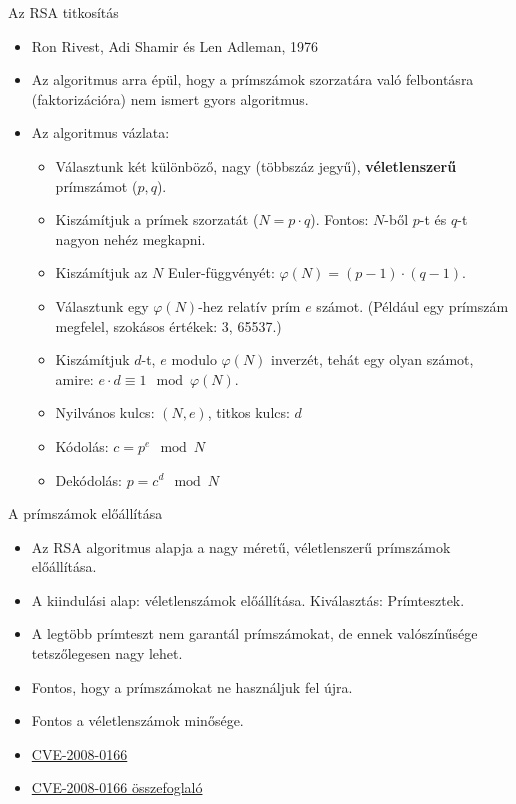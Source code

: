 \documentclass[12 pt]{beamer}
\begin{document}
\begin{frame}{Az RSA titkosítás}
  \begin{itemize}
    \item{Ron Rivest, Adi Shamir és Len Adleman, 1976}
    \item{Az algoritmus arra épül, hogy a prímszámok szorzatára való felbontásra (faktorizációra) nem ismert gyors algoritmus.}
    \item{Az algoritmus vázlata:}
      \begin{itemize}
        \item{Választunk két különböző, nagy (többszáz jegyű), \textbf{véletlenszerű} prímszámot ($p, q$).}
        \item{Kiszámítjuk a prímek szorzatát ($N = p \cdot q$). Fontos: $N$-ből $p$-t és $q$-t nagyon nehéz megkapni.}
        \item{Kiszámítjuk az $N$ Euler-függvényét: $\varphi(N) = (p-1) \cdot (q-1)$.}
        \item{Választunk egy $\varphi(N)$-hez relatív prím $e$ számot. (Például egy prímszám megfelel, szokásos értékek: 3, 65537.)}
        \item{Kiszámítjuk $d$-t, $e$ modulo $\varphi(N)$ inverzét, tehát egy olyan számot, amire: $e \cdot d \equiv 1 \mod \varphi(N)$.}
        \item{Nyilvános kulcs: $(N, e)$, titkos kulcs: $d$}
        \item{Kódolás: $c = p^e \mod N$}
        \item{Dekódolás: $p = c^d \mod N$}
      \end{itemize}
  \end{itemize}
\end{frame}

\begin{frame}{A prímszámok előállítása}
  \begin{itemize}
    \item{Az RSA algoritmus alapja a nagy méretű, véletlenszerű prímszámok előállítása.}
    \item{A kiindulási alap: véletlenszámok előállítása. Kiválasztás: Prímtesztek.}
    \item{A legtöbb prímteszt nem garantál prímszámokat, de ennek valószínűsége tetszőlegesen nagy lehet.}
    \item{Fontos, hogy a prímszámokat ne használjuk fel újra.}
    \item{Fontos a véletlenszámok minősége.}
    \item{\href{https://www.cve.org/CVERecord?id=CVE-2008-0166}{CVE-2008-0166}}
    \item{\href{https://github.com/g0tmi1k/debian-ssh}{CVE-2008-0166 összefoglaló}}
  \end{itemize}
\end{frame}
\end{document}

